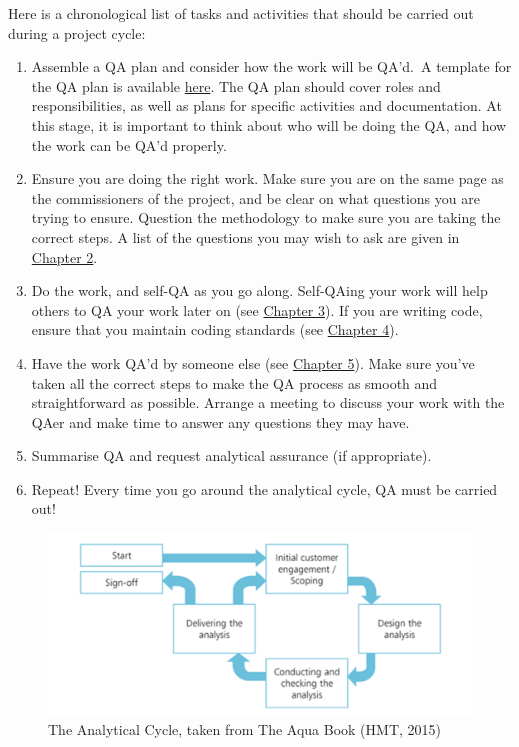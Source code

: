 \documentclass[
]{article}
\begin{document}
Here is a chronological list of tasks and activities that should be carried out during a project cycle:

\begin{enumerate}
\def\labelenumi{\arabic{enumi}.}
\item
  Assemble a QA plan and consider how the work will be QA'd.~A template for the QA plan is available \href{https://educationgovuk.sharepoint.com/:w:/r/sites/sarpi/g/_layouts/15/Doc.aspx?sourcedoc=\%7B09C73885-8C47-4191-9B29-6C34C203723D\%7D\&file=QA_plan_template.docx\&action=default\&mobileredirect=true}{here}. The QA plan should cover roles and responsibilities, as well as plans for specific activities and documentation. At this stage, it is important to think about who will be doing the QA, and how the work can be QA'd properly.
\item
  Ensure you are doing the right work. Make sure you are on the same page as the commissioners of the project, and be clear on what questions you are trying to ensure. Question the methodology to make sure you are taking the correct steps. A list of the questions you may wish to ask are given in \protect\hyperlink{asking-questions}{Chapter 2}.
\item
  Do the work, and self-QA as you go along. Self-QAing your work will help others to QA your work later on (see \protect\hyperlink{qaing-your-own-work}{Chapter 3}). If you are writing code, ensure that you maintain coding standards (see \protect\hyperlink{coding}{Chapter 4}).
\item
  Have the work QA'd by someone else (see \protect\hyperlink{getting-qa-support-from-others}{Chapter 5}). Make sure you've taken all the correct steps to make the QA process as smooth and straightforward as possible. Arrange a meeting to discuss your work with the QAer and make time to answer any questions they may have.
\item
  Summarise QA and request analytical assurance (if appropriate).
\item
  Repeat! Every time you go around the analytical cycle, QA must be carried out!
\end{enumerate}

\begin{figure}
\centering
\includegraphics{pictures/analytical-cycle.png}
\caption{The Analytical Cycle, taken from The Aqua Book (HMT, 2015)}
\end{figure}
\end{document}

